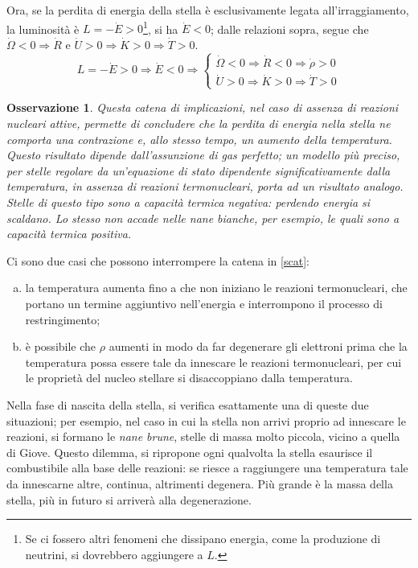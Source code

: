 \documentclass[11pt, a4paper]{scrartcl}
\theoremstyle{style}
\newtheorem{osservazione}{Osservazione}[section]
\theoremstyle{style1}
\numberwithin{equation}{subsection}
\begin{document}
Ora, se la perdita di energia della stella \`e esclusivamente legata all'irraggiamento, la luminosit\`a \`e $L = - \dot{E} > 0$\footnote{Se ci fossero altri fenomeni che dissipano energia, come la produzione di neutrini, si dovrebbero aggiungere a $L$.}, si ha $\dot{E}<0$; dalle relazioni sopra, segue che $\dot{\Omega }<0\Rightarrow \dot{R}$ e $\dot{U}> 0 \Rightarrow \dot{K}> 0 \Rightarrow \dot{T}>0$.
\begin{equation}\label{scat}
	L = - \dot{E} > 0 \Rightarrow  \dot{E}<0 \Rightarrow \begin{cases}
		\dot{\Omega } < 0 \Rightarrow  \dot{R}<0 \Rightarrow \dot{\rho }>0 \\
		\dot{U} > 0 \Rightarrow  \dot{K} > 0 \Rightarrow  \dot{T}>0
	\end{cases}
\end{equation}
\begin{osservazione}
Questa catena di implicazioni, nel caso di assenza di reazioni nucleari attive, permette di concludere che la perdita di energia nella stella ne comporta una contrazione e, allo stesso tempo, un aumento della temperatura.
Questo risultato dipende dall'assunzione di gas perfetto; un modello pi\`u preciso, per stelle regolare da un'equazione di stato dipendente \textit{significativamente} dalla temperatura, in assenza di reazioni termonucleari, porta ad un risultato analogo.
Stelle di questo tipo sono a capacit\`a termica negativa: perdendo energia si scaldano.
Lo stesso non accade nelle nane bianche, per esempio, le quali sono a capacit\`a termica positiva.
\end{osservazione}
\noindent Ci sono due casi che possono interrompere la catena in \ref{scat}:
\begin{enumerate}[(a).]
	\item la temperatura aumenta fino a che non iniziano le reazioni termonucleari, che portano un termine aggiuntivo nell'energia e interrompono il processo di restringimento;
	\item \`e possibile che $\rho $ aumenti in modo da far degenerare gli elettroni prima che la temperatura possa essere tale da innescare le reazioni termonucleari, per cui le propriet\`a del nucleo stellare si disaccoppiano dalla temperatura.
\end{enumerate}
Nella fase di nascita della stella, si verifica esattamente una di queste due situazioni; per esempio, nel caso in cui la stella non arrivi proprio ad innescare le reazioni, si formano le \textit{nane brune}, stelle di massa molto piccola, vicino a quella di Giove.
Questo dilemma, si ripropone ogni qualvolta la stella esaurisce il combustibile alla base delle reazioni: se riesce a raggiungere una temperatura tale da innescarne altre, continua, altrimenti degenera.
Pi\`u grande \`e la massa della stella, pi\`u in futuro si arriver\`a alla degenerazione.
\end{document}
